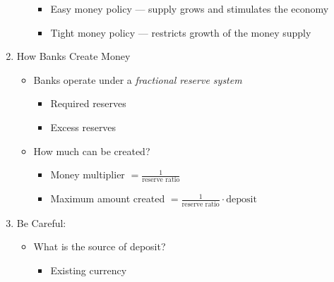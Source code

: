 \documentclass[12pt]{article}
\begin{document}
\begin{enumerate}
\begin{itemize}
        \begin{itemize}

          \item Easy money policy — supply grows and stimulates the economy

          \item Tight money policy — restricts growth of the money supply

        \end{itemize}

    \end{itemize}

  \item How Banks Create Money

    \begin{itemize}

      \item Banks operate under a \textit{fractional reserve system}

        \begin{itemize}

          \item Required reserves

          \item Excess reserves

        \end{itemize}

      \item How much can be created?

        \begin{itemize}

          \item Money multiplier $= \frac{1}{\text{reserve ratio}}$

          \item Maximum amount created $= \frac{1}{\text{reserve ratio}}\cdot\text{deposit}$

        \end{itemize}

    \end{itemize}

  \item Be Careful:

    \begin{itemize}

      \item What is the source of deposit?

        \begin{itemize}

          \item Existing currency


\end{itemize}
\end{itemize}
\end{enumerate}
\end{document}
